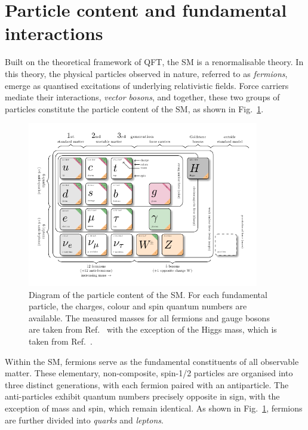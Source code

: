 \section{Particle content and fundamental interactions}
\label{Section:Particle content and fundamental interactions}
Built on the theoretical framework of \ac{QFT}, the \ac{SM} is a renormalisable theory. In this theory, the physical particles observed in nature, referred to as \textit{fermions}, emerge as quantised excitations of underlying relativistic fields. Force carriers mediate their interactions, \textit{vector bosons}, and together, these two groups of particles constitute the particle content of the \ac{SM}, as shown in Fig.~\ref{Figure:Introduction_1}.

\begin{figure}[ht]
\centering
\includegraphics[width= 0.9\textwidth]{Figures/Introduction/Particles.pdf}
\caption[Diagram of the particle content of the Standard Model]{Diagram of the particle content of the \ac{SM}. For each fundamental particle, the charges, colour and spin quantum numbers are available. The measured masses for all fermions and gauge bosons are taken from Ref.~\cite{ParticleMasses} with the exception of the Higgs mass, which is taken from Ref.~\cite{Higgs_Mass}.}
\label{Figure:Introduction_1}
\end{figure}

Within the \ac{SM}, fermions serve as the fundamental constituents of all observable matter. These elementary, non-composite, spin-1/2 particles are organised into three distinct generations, with each fermion paired with an antiparticle. The anti-particles exhibit quantum numbers precisely opposite in sign, with the exception of mass and spin, which remain identical. As shown in Fig.~\ref{Figure:Introduction_1}, fermions are further divided into \textit{quarks} and \textit{leptons}. 

